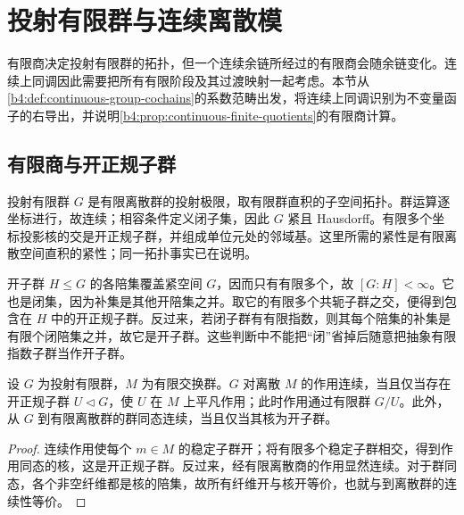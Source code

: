 

\section{投射有限群与连续离散模}
\label{b4:sec:C01}

有限商决定投射有限群的拓扑，但一个连续余链所经过的有限商会随余链变化。连续上同调因此需要把所有有限阶段及其过渡映射一起考虑。本节从\cref{b4:def:continuous-group-cochains}的系数范畴出发，将连续上同调识别为不变量函子的右导出，并说明\cref{b4:prop:continuous-finite-quotients}的有限商计算。

\subsection{有限商与开正规子群}
\label{b4:subsec:C01:01}

投射有限群 \(G\) 是有限离散群的投射极限，取有限群直积的子空间拓扑。群运算逐坐标进行，故连续；相容条件定义闭子集，因此 \(G\) 紧且 Hausdorff。有限多个坐标投影核的交是开正规子群，并组成单位元处的邻域基。这里所需的紧性是有限离散空间直积的紧性；同一拓扑事实已在说明。

\ProseParagraphBreak
开子群 \(H\le G\) 的各陪集覆盖紧空间 \(G\)，因而只有有限多个，故 \([G:H]<\infty\)。它也是闭集，因为补集是其他开陪集之并。取它的有限多个共轭子群之交，便得到包含在 \(H\) 中的开正规子群。反过来，若闭子群有有限指数，则其每个陪集的补集是有限个闭陪集之并，故它是开子群。这些判断中不能把“闭”省掉后随意把抽象有限指数子群当作开子群。

\begin{proposition}\label{b4:prop:C-finite-module-quotient}
	设 \(G\) 为投射有限群，\(M\) 为有限交换群。\(G\) 对离散 \(M\) 的作用连续，当且仅当存在开正规子群 \(U\triangleleft G\)，使 \(U\) 在 \(M\) 上平凡作用；此时作用通过有限群 \(G/U\)。此外，从 \(G\) 到有限离散群的群同态连续，当且仅当其核为开子群。
\end{proposition}
\begin{proof}
	连续作用使每个 \(m\in M\) 的稳定子群开；将有限多个稳定子群相交，得到作用同态的核，这是开正规子群。反过来，经有限离散商的作用显然连续。对于群同态，各个非空纤维都是核的陪集，故所有纤维开与核开等价，也就与到离散群的连续性等价。
\end{proof}


